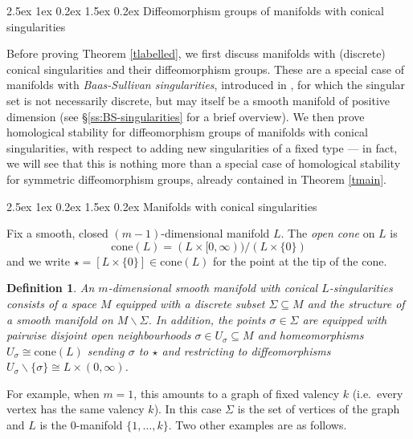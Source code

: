 \documentclass[reqno,a4paper]{article}
\makeatletter
\numberwithin{equation}{section}
\theoremstyle{italicised}
\theoremstyle{upright}
\newtheorem{defn}[thm]{Definition}
\theoremstyle{italicised-restate}
\renewcommand*{\section}{\@startsection{section}{1}{\z@}%
	{2.5ex \@plus 1ex \@minus 0.2ex}%
	{1.5ex \@plus 0.2ex}%
	{\normalfont\large\bfseries}}
\renewcommand*{\subsection}{\@startsection{subsection}{2}{\z@}%
	{2.5ex \@plus 1ex \@minus 0.2ex}%
	{1.5ex \@plus 0.2ex}%
	{\normalfont\normalsize\bfseries}}
\makeatother
\begin{document}
\section{Diffeomorphism groups of manifolds with conical singularities}\label{s:conical-singularities}


Before proving Theorem \ref{tlabelled}, we first discuss manifolds with (discrete) conical singularities and their diffeomorphism groups. These are a special case of manifolds with \emph{Baas-Sullivan singularities}, introduced in \cite{Sullivan1967Hauptvermutungmanifolds,Baas1973bordismtheorymanifolds}, for which the singular set is not necessarily discrete, but may itself be a smooth manifold of positive dimension (see \S\ref{ss:BS-singularities} for a brief overview). We then prove homological stability for diffeomorphism groups of manifolds with conical singularities, with respect to adding new singularities of a fixed type --- in fact, we will see that this is nothing more than a special case of homological stability for symmetric diffeomorphism groups, already contained in Theorem \ref{tmain}.


\subsection{Manifolds with conical singularities}\label{ss:conical}


Fix a smooth, closed $(m-1)$-dimensional manifold $L$. The \emph{open cone} on $L$ is
\[
\mathrm{cone}(L) = (L \times [0,\infty)) / (L \times \{0\})
\]
and we write $\star = [L \times \{0\}] \in \mathrm{cone}(L)$ for the point at the tip of the cone.

\begin{defn}\label{d:manifold-with-conical-sing}
An \emph{$m$-dimensional smooth manifold with conical $L$-singularities} consists of a space $M$ equipped with a discrete subset $\Sigma \subseteq M$ and the structure of a smooth manifold on $M \smallsetminus \Sigma$. In addition, the points $\sigma \in \Sigma$ are equipped with pairwise disjoint open neighbourhoods $\sigma \in U_\sigma \subseteq M$ and homeomorphisms $U_\sigma \cong \mathrm{cone}(L)$ sending $\sigma$ to $\star$ and restricting to diffeomorphisms $U_\sigma \smallsetminus \{\sigma\} \cong L \times (0,\infty)$.
\end{defn}

For example, when $m=1$, this amounts to a graph of fixed valency $k$ (i.e.\ every vertex has the same valency $k$). In this case $\Sigma$ is the set of vertices of the graph and $L$ is the $0$-manifold $\{1,\ldots,k\}$. Two other examples are as follows.
\end{document}
